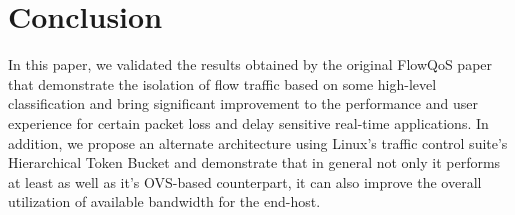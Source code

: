 \section{Conclusion}
\label{sec:conclusion}

In this paper, we validated the results obtained by the original FlowQoS paper ~\cite{Seddiki2014} that demonstrate the isolation of flow traffic based on some high-level classification and bring significant improvement to the performance and user experience for certain packet loss and delay sensitive real-time applications. In addition, we propose an alternate architecture using Linux's traffic control suite's Hierarchical Token Bucket and demonstrate that in general not only it performs at least as well as it's OVS-based counterpart, it can also improve the overall utilization of available bandwidth for the end-host.